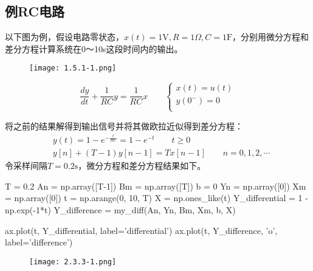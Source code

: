 \subsection{例RC电路}

\begin{example}
以下图为例，假设电路零状态，$x\left( t \right) =1\mathrm{V},R=1\Omega ,C=1\mathrm{F}$，分别用微分方程和差分方程计算系统在0～10s这段时间内的输出。
\end{example}

\begin{figure}[h]
\centering
\texttt{[image: 1.5.1-1.png]}
\end{figure}
\[
\frac{dy}{dt}+\frac{1}{RC}y=\frac{1}{RC}x \qquad \begin{cases}
	x\left( t \right) =u\left( t \right)\\
	y\left( 0^- \right) =0\\
\end{cases}
\]

将之前的结果解得到输出信号并将其做欧拉近似得到差分方程：
\begin{align*}
&y\left( t \right) =1-e^{-\frac{t}{RC}}=1-e^{-t} \qquad t\geqslant 0 \\
&y\left[ n \right] +\left( T-1 \right) y\left[ n-1 \right] =Tx\left[ n-1 \right] \qquad n=0,1,2,\cdots
\end{align*}
令采样间隔$T=0.2\mathrm{s}$，微分方程和差分方程结果如下。

\begin{python}
T  = 0.2
An = np.array([T-1])
Bm = np.array([T])
b  = 0
Yn = np.array([0])
Xm = np.array([0])
t  = np.arange(0, 10, T)
X  = np.ones_like(t)
Y_differential = 1 - np.exp(-1*t)
Y_difference   = my_diff(An, Yn, Bm, Xm, b, X)

ax.plot(t, Y_differential,      label='differential')
ax.plot(t, Y_difference,   'o', label='difference')
\end{python}

\begin{figure}[h]
\centering
\texttt{[image: 2.3.3-1.png]}
\end{figure}




